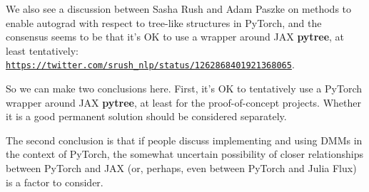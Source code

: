 \documentclass{article}
\begin{document}
We also see a discussion between Sasha Rush and Adam Paszke on methods to enable autograd with
respect to tree-like structures in PyTorch, and the consensus seems to be that it's OK to use
a wrapper around JAX {\bf pytree}, at least tentatively: \href{https://twitter.com/srush\_nlp/status/1262868401921368065}{\tt https://twitter.com/srush\_nlp/status/1262868401921368065}.

\vspace{0.1in}

So we can make two conclusions here. First, it's OK to tentatively use a PyTorch wrapper around
JAX {\bf pytree}, at least for the proof-of-concept projects. Whether it is a good permanent solution should be considered separately.

The second conclusion is that if people discuss implementing and using DMMs in the context of PyTorch, 
the somewhat uncertain possibility of closer relationships between PyTorch and JAX (or, perhaps, even between
PyTorch and Julia Flux) is a factor to consider.
\end{document}

